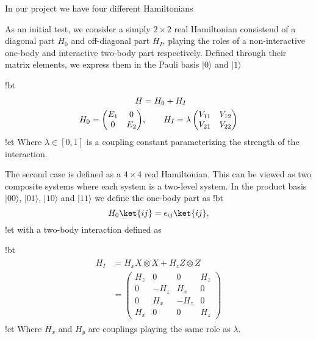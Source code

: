 
In our project we have four different Hamiltonians

As an initial test, we consider a simply $2\times 2$ real
Hamiltonian consistend of a diagonal part $H_0$ and off-diagonal part
$H_I$, playing the roles of a non-interactive one-body and interactive
two-body part respectively. Defined through their matrix elements, we
express them in the Pauli basis $\vert 0\rangle$ and $\vert 1 \rangle$

!bt
\begin{align*}
    \begin{split} 
        H &= H_0 + H_I \\
        H_0 = \begin{pmatrix}
            E_1 & 0 \\
            0 & E_2
        \end{pmatrix}&, \hspace{20px}
        H_I = \lambda \begin{pmatrix}
            V_{11} & V_{12} \\
            V_{21} & V_{22}
        \end{pmatrix}
    \end{split}
\end{align*}
!et
Where $\lambda \in [0,1]$ is a coupling constant parameterizing the strength of the interaction. 

The second case is defined as a $4 \times 4$ real Hamiltonian.
This can be viewed as two  composite systems where each system is a two-level system. In the product basis $\vert 00\rangle$, $\vert 01\rangle$, $\vert 10\rangle$ and $\vert 11\rangle$
we define the one-body part as 
!bt
\[
    H_0 \ket{ij} = \epsilon_{ij}\ket{ij}, 
\]
!et
with a two-body interaction defined as

!bt
\begin{align*}
    \begin{split} 
        H_I &= H_x X \otimes X + H_z Z \otimes Z \\
        &= \begin{pmatrix}
            H_z & 0 & 0 & H_z \\
            0 & - H_z & H_x & 0 \\
            0 & H_x & - H_z & 0 \\
            H_x & 0 & 0 & H_z
        \end{pmatrix}
    \end{split}
\end{align*}
!et
Where $H_x$
and $H_y$ are couplings playing the same role as $\lambda$.






